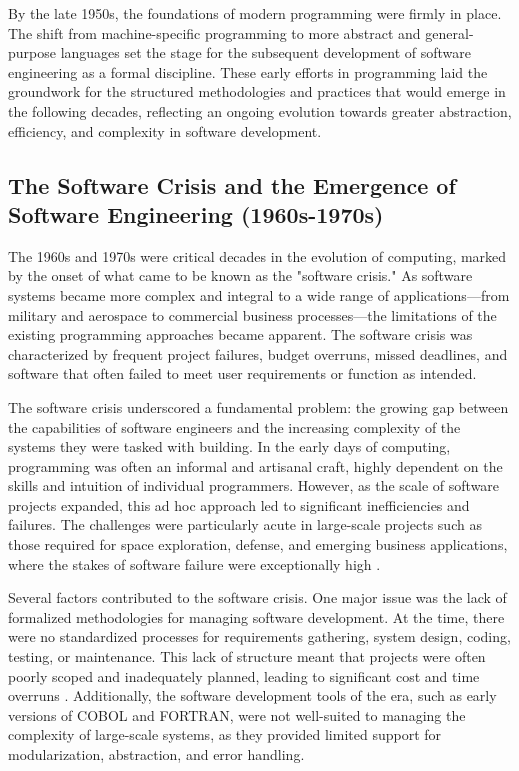 \begin{refsection}
By the late 1950s, the foundations of modern programming were firmly in place. The shift from machine-specific programming to more abstract and general-purpose languages set the stage for the subsequent development of software engineering as a formal discipline. These early efforts in programming laid the groundwork for the structured methodologies and practices that would emerge in the following decades, reflecting an ongoing evolution towards greater abstraction, efficiency, and complexity in software development.

\subsection{The Software Crisis and the Emergence of Software Engineering (1960s-1970s)}

The 1960s and 1970s were critical decades in the evolution of computing, marked by the onset of what came to be known as the "software crisis." As software systems became more complex and integral to a wide range of applications—from military and aerospace to commercial business processes—the limitations of the existing programming approaches became apparent. The software crisis was characterized by frequent project failures, budget overruns, missed deadlines, and software that often failed to meet user requirements or function as intended.

The software crisis underscored a fundamental problem: the growing gap between the capabilities of software engineers and the increasing complexity of the systems they were tasked with building. In the early days of computing, programming was often an informal and artisanal craft, highly dependent on the skills and intuition of individual programmers. However, as the scale of software projects expanded, this ad hoc approach led to significant inefficiencies and failures. The challenges were particularly acute in large-scale projects such as those required for space exploration, defense, and emerging business applications, where the stakes of software failure were exceptionally high \cite[pp.~30-33]{ensmenger2010computer}.

Several factors contributed to the software crisis. One major issue was the lack of formalized methodologies for managing software development. At the time, there were no standardized processes for requirements gathering, system design, coding, testing, or maintenance. This lack of structure meant that projects were often poorly scoped and inadequately planned, leading to significant cost and time overruns \cite[pp.~123-126]{pressman2019software}. Additionally, the software development tools of the era, such as early versions of COBOL and FORTRAN, were not well-suited to managing the complexity of large-scale systems, as they provided limited support for modularization, abstraction, and error handling.


\end{refsection}
